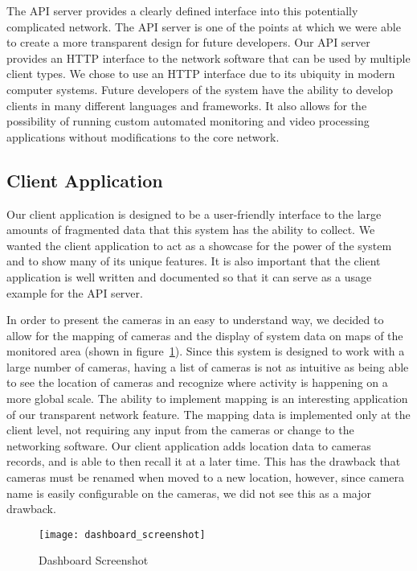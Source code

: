 The API server provides a clearly defined interface into this potentially
complicated network. The API server is one of the points at which we were able
to create a more transparent design for future developers. Our API server
provides an HTTP interface to the network software that can be used by multiple
client types. We chose to use an HTTP interface due to its ubiquity in modern
computer systems. Future developers of the system have the ability to develop
clients in many different languages and frameworks. It also allows for the
possibility of running custom automated monitoring and video processing
applications without modifications to the core network.

\subsection{Client Application}

Our client application is designed to be a user-friendly interface to the large
amounts of fragmented data that this system has the ability to collect. We
wanted the client application to act as a showcase for the power of the system
and to show many of its unique features. It is also important that the client
application is well written and documented so that it can serve as a usage
example for the API server.

In order to present the cameras in an easy to understand way, we decided to
allow for the mapping of cameras and the display of system data on maps of the
monitored area (shown in figure~\ref{dashboard_screenshot}). Since this system
is designed to work with a large number of cameras, having a list of cameras is
not as intuitive as being able to see the location of cameras and recognize
where activity is happening on a more global scale. The ability to implement
mapping is an interesting application of our transparent network feature. The
mapping data is implemented only at the client level, not requiring any input
from the cameras or change to the networking software. Our client application
adds location data to cameras records, and is able to then recall it at a later
time.  This has the drawback that cameras must be renamed when moved to a new
location, however, since camera name is easily configurable on the cameras, we
did not see this as a major drawback.

\begin{figure}[!t]
\centering
\texttt{[image: dashboard\_screenshot]}
\caption{Dashboard Screenshot}
\label{dashboard_screenshot}
\end{figure}

